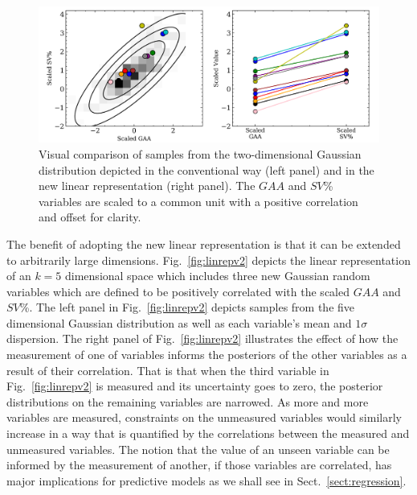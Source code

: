 \begin{figure}
  \centering
  \includegraphics[width=\hsize]{figures/linearrep_v1.png}
  \caption[Linear representation of Gaussian random variables in two dimensions.]
          {Visual comparison of samples from the two-dimensional Gaussian distribution
            depicted in the
            conventional way (left panel) and in the new linear representation (right
            panel). The $GAA$ and $SV$\% variables are scaled to a common unit with a
            positive correlation and offset for clarity.}
  \label{fig:linrep}
\end{figure}


The benefit of adopting the new linear representation is that it can be extended to
arbitrarily large dimensions. Fig.~\ref{fig:linrepv2} depicts the linear representation
of an $k=5$ dimensional space which includes three new Gaussian random variables which
are defined to be positively correlated with the scaled $GAA$ and $SV$\%. The left panel
in Fig.~\ref{fig:linrepv2} depicts samples from the five dimensional Gaussian distribution
as well as each variable's mean and $1\sigma$ dispersion. The right panel of
Fig.~\ref{fig:linrepv2} illustrates the effect of how the measurement of one of variables
informs the posteriors of the other variables as a result of their correlation. That is
that when the third variable in Fig.~\ref{fig:linrepv2} is measured and its uncertainty
goes to zero, the posterior distributions on the remaining variables are narrowed. As
more and more variables are measured, constraints on the unmeasured variables would
similarly increase in a way that is quantified by the correlations between the
measured and unmeasured variables.
The notion that the value of an unseen variable can be informed by the measurement
of another, if those variables are correlated, has major implications for
predictive models as we shall see in Sect.~\ref{sect:regression}. \\

